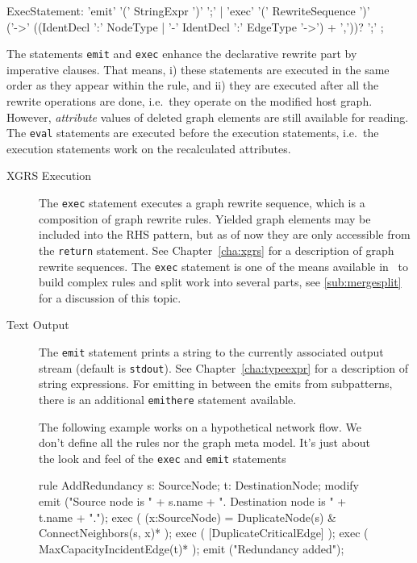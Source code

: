 \begin{rail}  
  ExecStatement: 'emit' '(' StringExpr ')' ';' |
    'exec' '(' RewriteSequence ')' \\ ('->' ((IdentDecl ':' NodeType | '-' IdentDecl ':' EdgeType '->') + ','))? ';'
	;
\end{rail}
The statements \texttt{emit} and \texttt{exec} enhance the declarative rewrite part by imperative clauses.
That means, i) these statements are executed in the same order as they appear within the rule,
and ii) they are executed after all the rewrite operations are done, i.e.\ they operate on the modified host graph.
However, \emph{attribute} values of deleted graph elements are still available for reading.
The \texttt{eval} statements are executed before the execution statements, i.e.\ the execution statements work on the recalculated attributes.
\begin{description}
  \item[XGRS Execution] The \texttt{exec} statement executes a graph rewrite sequence, which is a composition of graph rewrite rules. Yielded graph elements may be included into the RHS pattern, but as of now they are only accessible from the \texttt{return} statement. See Chapter~\ref{cha:xgrs} for a description of graph rewrite sequences. The \texttt{exec} statement is one of the means available in \GrG~to build complex rules and split work into several parts, see \ref{sub:mergesplit} for a discussion of this topic.
  \item[Text Output] The \texttt{emit} statement prints a string to the currently associated output stream (default is \texttt{stdout}). See Chapter~\ref{cha:typeexpr} for a description of string expressions.
  For emitting in between the emits from subpatterns, there is an additional \texttt{emithere} statement available.
\end{description}

\begin{figure}[htbp]
\begin{example}
	The following example works on a hypothetical network flow.
	We don't define all the rules nor the graph meta model.
	It's just about the look and feel of the \texttt{exec} and \texttt{emit} statements
	\begin{grgen}
rule AddRedundancy
{
  s: SourceNode;
  t: DestinationNode;	
  modify {
    emit ("Source node is " + s.name + ". Destination node is " + t.name + ".");
    exec ( (x:SourceNode) = DuplicateNode(s) & ConnectNeighbors(s, x)* );
    exec ( [DuplicateCriticalEdge] );
    exec ( MaxCapacityIncidentEdge(t)* );
    emit ("Redundancy added");
  }
}  
	\end{grgen}
\end{example}
\end{figure}

